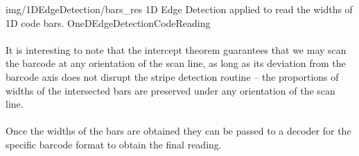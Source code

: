 \oneFigure
{img/1DEdgeDetection/bars_res}
{1D Edge Detection applied to read the widths of 1D code bars.}
{OneDEdgeDetectionCodeReading}
{\basicWidth}

\paragraph*{}
It is interesting to note that the intercept theorem guarantees that we may scan the barcode at any orientation of the scan line, as long as its deviation from the barcode axis does not disrupt the stripe detection routine -- the proportions of widths of the intersected bars are preserved under any orientation of the scan line.

\paragraph*{}
Once the widths of the bars are obtained they can be passed to a decoder for the specific barcode format to obtain the final reading.








